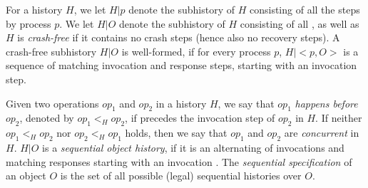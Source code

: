 For a history $H$, we let $H | p$ denote the subhistory of $H$
consisting of all the steps by process $p$.
We let $H | O$ denote the subhistory of $H$
consisting of all ,
as well as 
$H$ is \emph{crash-free} if it contains no crash steps (hence also no recovery steps).
A crash-free subhistory $H | O$ is well-formed,
if for every process $p$, $H|{<}p,O{>}$ is a sequence of  matching invocation
and response steps, starting with an invocation step.





Given two operations $op_1$ and $op_2$ in a history $H$,
we say that $op_1$ \textit{happens before} $op_2$,
denoted by $op_1 <_H op_2$, if  precedes the invocation step of $op_2$ in $H$.
If neither $op_1 <_H op_2$ nor $op_2 <_H op_1$ holds,
then we say that $op_1$ and $op_2$ are \textit{concurrent} in $H$.
$H | O$ is a \emph{sequential object history}, if it is an alternating 
of invocations and  matching responses starting with an invocation
.
The \textit{sequential specification} of an object $O$ is the set of
all possible (legal) sequential histories over $O$.


